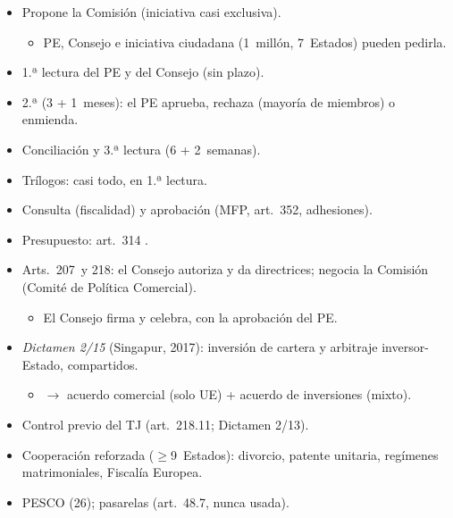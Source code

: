 \documentclass{article}
\begin{document}
\begin{columnas}
\begin{itemize}
\item Propone la Comisión (iniciativa casi exclusiva).
  \begin{itemize}
  \item PE, Consejo e iniciativa ciudadana (1~millón, 7~Estados) pueden pedirla.
  \end{itemize}
\item 1.ª lectura del PE y del Consejo (sin plazo).
\item 2.ª (3 + 1~meses): el PE aprueba, rechaza (mayoría de miembros) o enmienda.
\item Conciliación y 3.ª lectura (6 + 2~semanas).
\item Trílogos: casi todo, en 1.ª lectura.
\end{itemize}
\begin{itemize}
\item Consulta (fiscalidad) y aprobación (MFP, art.~352, adhesiones).
\item Presupuesto: art.~314 .
\end{itemize}
\begin{itemize}
\item Arts.~207~y 218: el Consejo autoriza y da directrices; negocia la Comisión (Comité de Política Comercial).
  \begin{itemize}
  \item El Consejo firma y celebra, con la aprobación del PE.
  \end{itemize}
\item \emph{Dictamen 2/15} (Singapur, 2017): inversión de cartera y arbitraje inversor-Estado, compartidos.
  \begin{itemize}
  \item $\to$ acuerdo comercial (solo UE) + acuerdo de inversiones (mixto).
  \end{itemize}
\item Control previo del TJ (art.~218.11; Dictamen 2/13).
\end{itemize}
\begin{itemize}
\item Cooperación reforzada ($\geq$9~Estados): divorcio, patente unitaria, regímenes matrimoniales, Fiscalía Europea.
\item PESCO (26); pasarelas (art.~48.7, nunca usada).
\end{itemize}


\end{columnas}
\end{document}
